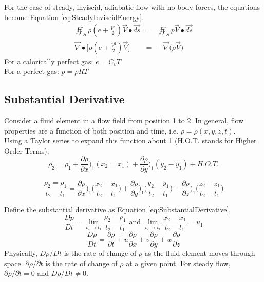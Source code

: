 \documentclass[draft=false, titlepage]{article}
\newcommand{\gradient}{\vec{\nabla}}
\begin{document}
For the case of steady, inviscid, adiabatic flow with no body forces, the equations become Equation \ref{eq:SteadyInviscidEnergy}.
\begin{equation}
    \begin{array}{rcl}
    \oiint_S \rho (e+\frac{V^2}{2}) \vec{V} \bullet \vec{ds} &=& \oiint_S p\vec{V} \bullet \vec{ds} \\
    \gradient \bullet \Big[ \rho (e+\frac{V^2}{2})\vec{V} \Big] &=& -\gradient \dot (\rho \vec{V})
    \end{array}
    \label{eq:SteadyInviscidEnergy}
\end{equation}
For a calorically perfect gas: $e=C_v T$\\
For a perfect gas: $p=\rho RT$

\subsection{Substantial Derivative}
Consider a fluid element in a flow field from position 1 to 2. In general, flow properties are a function of both position and time, i.e. $\rho = \rho(x, y, z, t)$.\\
Using a Taylor series to expand this function about 1 (H.O.T. stands for Higher Order Terms):
\begin{equation*}
    \rho_2 = \rho_1 + \frac{\partial \rho}{\partial x}\Big)_1 (x_2=x_1)+ \frac{\partial\rho}{\partial y}\Big)_1 (y_2-y_1) + H.O.T.
\end{equation*}

\begin{equation*}
    \frac{\rho_2=\rho_1}{t_2-t_1} = \frac{\partial\rho}{\partial x}\Big)_1 \Big(\frac{x_2-x_1}{t_2-t_1}\Big) +
    \frac{\partial \rho}{\partial y}\Big)_1 \Big(\frac{y_2-y_1}{t_2-t_1}\Big) +
    \frac{\partial \rho}{\partial z}\Big)_1 \Big(\frac{z_2-z_1}{t_2-t_1}\Big)
\end{equation*}

Define the substantial derivative as Equation \ref{eq:SubstantialDerivative}.
\begin{equation*}
    \frac{Dp}{Dt}= \lim\limits_{t_2\rightarrow t_1} \frac{\rho_2-\rho_1}{t_2-t_1} \text{ and }
    \lim\limits_{t_2\rightarrow t_1} \frac{x_2-x_1}{t_2-t_1} = u_1
\end{equation*}
\begin{equation}
    \frac{D\rho}{Dt} = \frac{\partial \rho}{\partial t} + u \frac{\partial \rho}{\partial x} + v\frac{\partial \rho}{\partial y} + w\frac{\partial \rho}{\partial z}
    \label{eq:SubstantialDerivative}
\end{equation}
Physically, $D\rho /Dt$ is the rate of change of $\rho$ as the fluid element moves through space. $\partial \rho / \partial t$ is the rate of change of $\rho$ at a given point. For steady flow, $\partial \rho /\partial t = 0$ and $D\rho /Dt \neq 0$.
\end{document}
